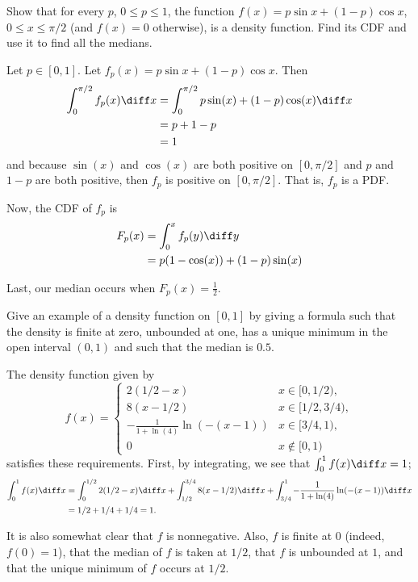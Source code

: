 \begin{problem}[Handout 12, \# 16]
  Show that for every \(p\), \(0\leq p\leq 1\), the function
  \(f(x)=p\sin x+(1-p)\cos x\), \(0\leq x\leq\pi/2\) (and \(f(x)=0\)
  otherwise), is a density function. Find its CDF and use it to find all
  the medians.
\end{problem}
\begin{solution}
  Let $p \in [0,1]$. Let $f_p(x) = p\sin x+(1-p)\cos x$. Then
  \begin{align*}
    \int_0^{\pi/2} f_p(x) \diff x
    &= \int_0^{\pi/2} p \sin(x) + (1-p) \cos(x) \diff x\\
    &= p + 1 - p\\
    &=1
  \end{align*}
  and because $\sin(x)$ and $\cos(x)$ are both positive on $[0,\pi/2]$ and
  $p$ and $1-p$ are both positive, then $f_p$ is positive on $[0,\pi/2]$.
  That is, $f_p$ is a PDF.

  Now, the CDF of $f_p$ is
  \begin{align*}
    F_p(x) &= \int_0^x f_p(y) \diff y \\
           &= p(1 - \cos(x)) + (1-p) \sin(x)
  \end{align*}

  Last, our median occurs when $F_p(x) = \frac{1}{2}$.
\end{solution}
\newpage

\begin{problem}[Handout 12, \# 17]
  Give an example of a density function on \([0,1]\) by giving a formula
  such that the density is finite at zero, unbounded at one, has a unique
  minimum in the open interval \((0,1)\) and such that the median is
  \(0.5\).
\end{problem}
\begin{solution}
  The density function given by
  \[
    f(x) =
    \begin{cases}
      2(1/2-x) & x \in [0,1/2),\\
      8(x-1/2) & x \in [1/2,3/4),\\
      -\frac{1}{1+\ln(4)}\ln(-(x-1)) & x \in [3/4,1),\\
      0 & x \notin [0,1)
    \end{cases}
  \]
  satisfies these requirements. First, by integrating, we see that
  $\int_0^1 f(x)\diff x = 1$;
  \begin{align*}
    \int_0^1 f(x) \diff x
    &= \int_0^{1/2} 2(1/2-x) \diff x + \int_{1/2}^{3/4}
      8(x-1/2) \diff x + \int_{3/4}^1
      -\frac{1}{1+\ln(4)}\ln(-(x-1)) \diff x \\
    &= 1/2 + 1/4 + 1/4 = 1.
  \end{align*}

  It is also somewhat clear that $f$ is nonnegative. Also, $f$ is finite at
  $0$ (indeed, $f(0) = 1$), that the median of $f$ is taken at $1/2$, that
  $f$ is unbounded at $1$, and that the unique minimum of $f$ occurs at
  $1/2$.
\end{solution}
\newpage

